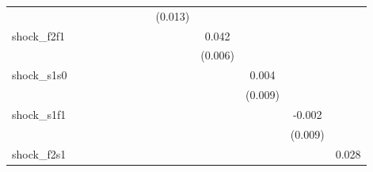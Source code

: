 {\begin{tabular}{l*{12}{c}}
            &                     &                     &                     &                     &                     &                     &                     &     (0.013)         &                     &                     &                     &                     \\
\addlinespace
shock\_f2f1  &                     &                     &                     &                     &                     &                     &                     &                     &       0.042\sym{***}&                     &                     &                     \\
            &                     &                     &                     &                     &                     &                     &                     &                     &     (0.006)         &                     &                     &                     \\
\addlinespace
shock\_s1s0  &                     &                     &                     &                     &                     &                     &                     &                     &                     &       0.004         &                     &                     \\
            &                     &                     &                     &                     &                     &                     &                     &                     &                     &     (0.009)         &                     &                     \\
\addlinespace
shock\_s1f1  &                     &                     &                     &                     &                     &                     &                     &                     &                     &                     &      -0.002         &                     \\
            &                     &                     &                     &                     &                     &                     &                     &                     &                     &                     &     (0.009)         &                     \\
\addlinespace
shock\_f2s1  &                     &                     &                     &                     &                     &                     &                     &                     &                     &                     &                     &       0.028\sym{***}\\

\end{tabular}}
